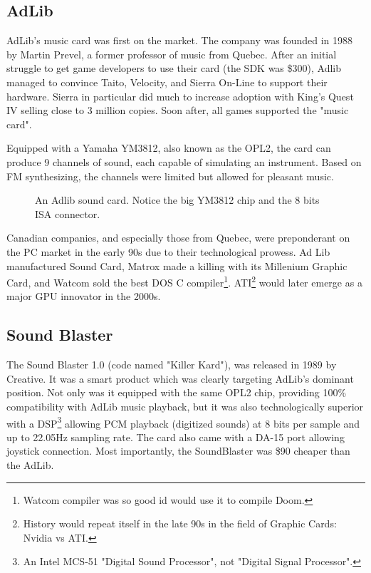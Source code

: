 \documentclass[book.tex]{subfiles}
\begin{document}
  \subsection{AdLib}
  AdLib's music card was first on the market. The company was founded in 1988 by Martin Prevel, a former professor of music from Quebec. After an initial struggle to get game developers to use their card (the SDK was \$300), Adlib managed to convince Taito, Velocity, and Sierra On-Line to support their hardware. Sierra in particular did much to increase adoption with King's Quest IV selling close to 3 million copies. Soon after, all games supported the "music card".\\
  \par
   Equipped with a Yamaha YM3812, also known as the OPL2, the card can produce 9 channels of sound, each capable of simulating an instrument. Based on FM synthesizing, the channels were limited but allowed for pleasant music.\\
  \begin{figure}[H] 
    \centering 
    \caption{An Adlib sound card. Notice the big YM3812 chip and the 8 bits ISA connector.}
  \end{figure}
   
\par
{} Canadian companies, and especially those from Quebec, were preponderant on the PC market in the early 90s due to their technological prowess. Ad Lib manufactured Sound Card, Matrox made a killing with its Millenium Graphic Card, and Watcom sold the best DOS C compiler\footnote{Watcom compiler was so good id would use it to compile Doom.}. ATI\footnote{History would repeat itself in the late 90s in the field of Graphic Cards: Nvidia vs ATI.} would later emerge as a major GPU innovator in the 2000s.\\
  
  


  \subsection{Sound Blaster}
  The Sound Blaster 1.0 (code named "Killer Kard"), was released in 1989 by Creative. It was a smart product which was clearly targeting AdLib's dominant position. Not only was it equipped with the same OPL2 chip, providing 100\% compatibility with AdLib music playback, but it was also technologically superior with a DSP\footnote{An Intel MCS-51 "Digital Sound Processor", not "Digital Signal Processor".}  allowing PCM playback (digitized sounds) at 8 bits per sample and up to 22.05Hz sampling rate. The card also came with a DA-15 port allowing joystick connection. Most importantly, the SoundBlaster was \$90 cheaper than the AdLib.\\ 
\par
\end{document}
